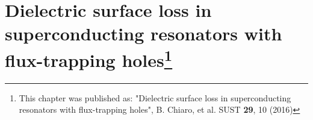 \chapter[Dielectric surface loss in superconducting resonators with flux-trapping holes]{Dielectric surface loss in superconducting resonators with flux-trapping holes\footnote{This chapter was published as: "Dielectric surface loss in superconducting resonators with flux-trapping holes",  B. Chiaro, et al. SUST \textbf{29}, 10 (2016)}}
\label{ch:vortex}


%
\def \Bcapp {\text{B}^{\textrm{cool}}_{\textrm{applied}}}
\def \Qtlsparticipation {1/Q_{\text{TLS}} = \Sigma_{i}\, p_i \tan \delta_i}

